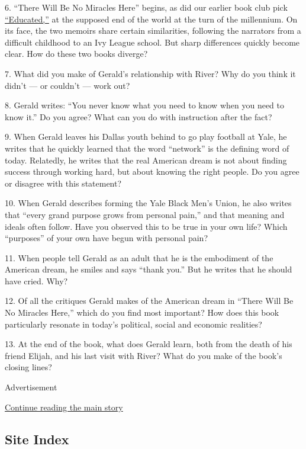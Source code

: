 6. ``There Will Be No Miracles Here'' begins, as did our earlier book
club pick
\href{https://www.nytimes3xbfgragh.onion/2018/03/01/books/review/tara-westover-educated.html}{``Educated,''}
at the supposed end of the world at the turn of the millennium. On its
face, the two memoirs share certain similarities, following the
narrators from a difficult childhood to an Ivy League school. But sharp
differences quickly become clear. How do these two books diverge?

7. What did you make of Gerald's relationship with River? Why do you
think it didn't --- or couldn't --- work out?

8. Gerald writes: ``You never know what you need to know when you need
to know it.'' Do you agree? What can you do with instruction after the
fact?

9. When Gerald leaves his Dallas youth behind to go play football at
Yale, he writes that he quickly learned that the word ``network'' is the
defining word of today. Relatedly, he writes that the real American
dream is not about finding success through working hard, but about
knowing the right people. Do you agree or disagree with this statement?

10. When Gerald describes forming the Yale Black Men's Union, he also
writes that ``every grand purpose grows from personal pain,'' and that
meaning and ideals often follow. Have you observed this to be true in
your own life? Which ``purposes'' of your own have begun with personal
pain?

11. When people tell Gerald as an adult that he is the embodiment of the
American dream, he smiles and says ``thank you.'' But he writes that he
should have cried. Why?

12. Of all the critiques Gerald makes of the American dream in ``There
Will Be No Miracles Here,'' which do you find most important? How does
this book particularly resonate in today's political, social and
economic realities?

13. At the end of the book, what does Gerald learn, both from the death
of his friend Elijah, and his last visit with River? What do you make of
the book's closing lines?

Advertisement

\protect\hyperlink{after-bottom}{Continue reading the main story}

\hypertarget{site-index}{%
\subsection{Site Index}\label{site-index}}

